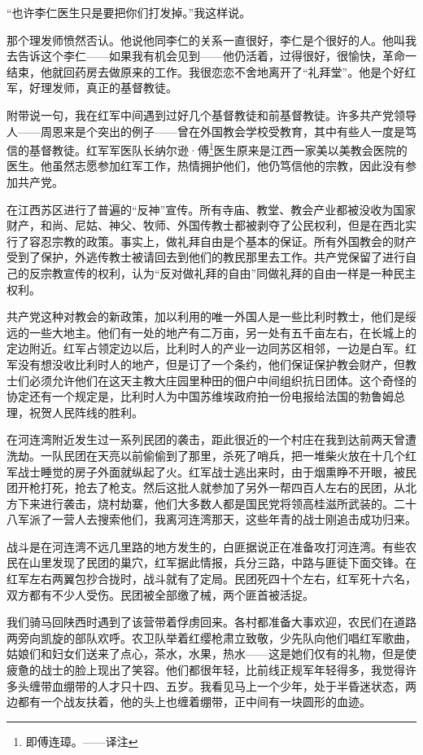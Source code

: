 \documentclass[10pt]{book}
\begin{document}
“也许李仁医生只是要把你们打发掉。”我这样说。

那个理发师愤然否认。他说他同李仁的关系一直很好，李仁是个很好的人。他叫我去告诉这个李仁——如果我有机会见到——他仍活着，过得很好，很愉快，革命一结束，他就回药房去做原来的工作。我很恋恋不舍地离开了“礼拜堂”。他是个好红军，好理发师，真正的基督教徒。

附带说一句，我在红军中间遇到过好几个基督教徒和前基督教徒。许多共产党领导人——周恩来是个突出的例子——曾在外国教会学校受教育，其中有些人一度是笃信的基督教徒。红军军医队长纳尔逊·傅\footnote{即傅连璋。——译注}医生原来是江西一家美以美教会医院的医生。他虽然志愿参加红军工作，热情拥护他们，他仍笃信他的宗教，因此没有参加共产党。

在江西苏区进行了普遍的“反神”宣传。所有寺庙、教堂、教会产业都被没收为国家财产，和尚、尼姑、神父、牧师、外国传教士都被剥夺了公民权利，但是在西北实行了容忍宗教的政策。事实上，做礼拜自由是个基本的保证。所有外国教会的财产受到了保护，外逃传教士被请回去到他们的教民那里去工作。共产党保留了进行自己的反宗教宣传的权利，认为“反对做礼拜的自由”同做礼拜的自由一样是一种民主权利。

共产党这种对教会的新政策，加以利用的唯一外国人是一些比利时教士，他们是绥远的一些大地主。他们有一处的地产有二万亩，另一处有五千亩左右，在长城上的定边附近。红军占领定边以后，比利时人的产业一边同苏区相邻，一边是白军。红军没有想没收比利时人的地产，但是订了一个条约，他们保证保护教会财产，但教士们必须允许他们在这天主教大庄园里种田的佃户中间组织抗日团体。这个奇怪的协定还有一个规定是，比利时人为中国苏维埃政府拍一份电报给法国的勃鲁姆总理，祝贺人民阵线的胜利。

在河连湾附近发生过一系列民团的袭击，距此很近的一个村庄在我到达前两天曾遭洗劫。一队民团在天亮以前偷偷到了那里，杀死了哨兵，把一堆柴火放在十几个红军战士睡觉的房子外面就纵起了火。红军战士逃出来时，由于烟熏睁不开眼，被民团开枪打死，抢去了枪支。然后这批人就参加了另外一帮四百人左右的民团，从北方下来进行袭击，烧村劫寨，他们大多数人都是国民党将领高桂滋所武装的。二十八军派了一营人去搜索他们，我离河连湾那天，这些年青的战士刚追击成功归来。

战斗是在河连湾不远几里路的地方发生的，白匪据说正在准备攻打河连湾。有些农民在山里发现了民团的巢穴，红军据此情报，兵分三路，中路与匪徒下面交锋。在红军左右两翼包抄合拢时，战斗就有了定局。民团死四十个左右，红军死十六名，双方都有不少人受伤。民团被全部缴了械，两个匪首被活捉。

我们骑马回陕西时遇到了该营带着俘虏回来。各村都准备大事欢迎，农民们在道路两旁向凯旋的部队欢呼。农卫队举着红缨枪肃立致敬，少先队向他们唱红军歌曲，姑娘们和妇女们送来了点心，茶水，水果，热水——这是她们仅有的礼物，但是使疲惫的战士的脸上现出了笑容。他们都很年轻，比前线正规军年轻得多，我觉得许多头缠带血绷带的人才只十四、五岁。我看见马上一个少年，处于半昏迷状态，两边都有一个战友扶着，他的头上也缠着绷带，正中间有一块圆形的血迹。
\end{document}

